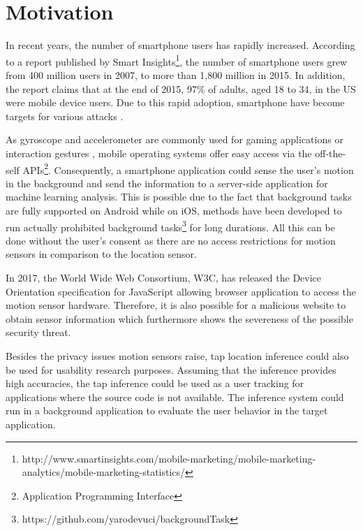 \section{Motivation}

In recent years, the number of smartphone users has rapidly
increased. According to a report published by Smart
Insights\footnote{http://www.smartinsights.com/mobile-marketing/mobile-marketing-analytics/mobile-marketing-statistics/}, the number of smartphone users grew from 400 million users in 2007, to more than 1,800 million in 2015. In addition, the report claims that at the end of 2015, 97\% of adults, aged 18 to 34, in the US were mobile device users. Due to this rapid adoption, smartphone have become targets for various attacks \cite{Colp:2015:PDS:2694344.2694380, Aviv:2010:SAS:1925004.1925009, Touchlogger}.

As gyroscope and accelerometer are commonly used for gaming applications\cite{feijoo2012mobile} or interaction gestures \cite{pylvanainen2005accelerometer}, mobile operating systems offer easy access via the off-the-self APIs\footnote{Application Programming Interface}. Consequently, a smartphone application could sense the user's motion in the background and send the information to a server-side application for machine learning analysis. This is possible due to the fact that background tasks are fully supported on Android while on iOS, methods have been developed to run actually prohibited background tasks\footnote{https://github.com/yarodevuci/backgroundTask} for long durations. All this can be done without the user's consent as there are no access restrictions for motion sensors in comparison to the location sensor.

In 2017, the World Wide Web Consortium, W3C, has released the Device Orientation specification \cite{w3c} for JavaScript allowing browser application to access the motion sensor hardware. Therefore, it is also possible for a malicious website to obtain sensor information which furthermore shows the severeness of the possible security threat.


Besides the privacy issues motion sensors raise, tap location inference could also be used for usability research purposes. Assuming that the inference provides high accuracies, the tap inference could be used as a user tracking for applications where the source code is not available. The inference system could run in a background application to evaluate the user behavior in the target application.


